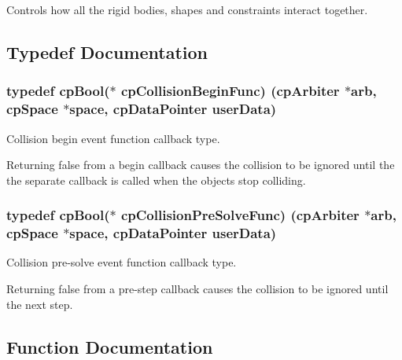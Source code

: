 Controls how all the rigid bodies, shapes and constraints interact together. 

\subsection{Typedef Documentation}
\hypertarget{group__cp_space_ga3134f145bfc7ca4ef69b350978c26a5a}{}
\subsubsection[{cp\+Collision\+Begin\+Func}]{\setlength{\rightskip}{0pt plus 5cm}typedef {\bf cp\+Bool}($\ast$ cp\+Collision\+Begin\+Func) ({\bf cp\+Arbiter} $\ast$arb, {\bf cp\+Space} $\ast$space, {\bf cp\+Data\+Pointer} user\+Data)}\label{group__cp_space_ga3134f145bfc7ca4ef69b350978c26a5a}


Collision begin event function callback type. 

Returning false from a begin callback causes the collision to be ignored until the the separate callback is called when the objects stop colliding. \hypertarget{group__cp_space_ga89b24d53d81a5a028198c3c2d3c39a9d}{}
\subsubsection[{cp\+Collision\+Pre\+Solve\+Func}]{\setlength{\rightskip}{0pt plus 5cm}typedef {\bf cp\+Bool}($\ast$ cp\+Collision\+Pre\+Solve\+Func) ({\bf cp\+Arbiter} $\ast$arb, {\bf cp\+Space} $\ast$space, {\bf cp\+Data\+Pointer} user\+Data)}\label{group__cp_space_ga89b24d53d81a5a028198c3c2d3c39a9d}


Collision pre-\/solve event function callback type. 

Returning false from a pre-\/step callback causes the collision to be ignored until the next step. 

\subsection{Function Documentation}
\hypertarget{group__cp_space_ga1a530112830b93f746a90284d18b39e7}{}
